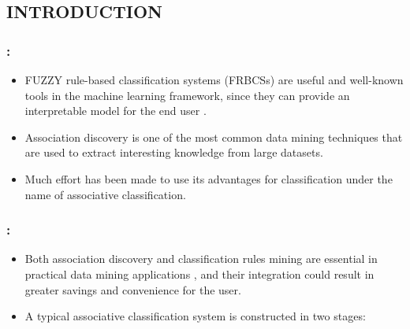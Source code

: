 \documentclass{beamer}
\begin{document}
\begin{CJK*}{UTF8}{bsmi}
\section{INTRODUCTION} %




\begin{frame}
	\frametitle{\insertsection : \insertsubsection}
	
	\begin{itemize}
		\item FUZZY rule-based classification systems (FRBCSs) are useful and well-known tools in the machine learning framework, since they can provide an interpretable model for the end user . 
		
		\item Association discovery is one of the most common data mining techniques that are used to extract interesting knowledge from large datasets.
		
		\item Much effort has been made to use its advantages for classification under the name of associative classification.
		
	\end{itemize}
	
\end{frame}


\begin{frame}
	\frametitle{\insertsection : \insertsubsection}
	\begin{itemize}
		\item Both association discovery and classification rules mining are essential in practical data mining applications , and their integration could result in greater savings and convenience for the user.
		\item A typical associative classification system is constructed in two stages:
	\end{itemize}
	\begin{block}{ }
		

\end{block}
\end{frame}
\end{CJK*}
\end{document}
